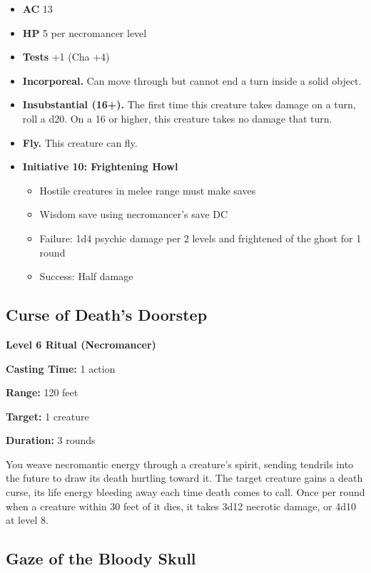 \documentclass[12pt,letterpaper,twocolumn,openany,nodeprecatedcode,bg=none]{dndbook}
\providecommand{\tightlist}{%
  \setlength{\itemsep}{0pt}\setlength{\parskip}{0pt}}
\begin{document}
\begin{itemize}
\tightlist
\item
  \textbf{AC} 13
\item
  \textbf{HP} 5 per necromancer level
\item
  \textbf{Tests} +1 (Cha +4)
\item
  \textbf{Incorporeal.} Can move through but cannot end a turn inside a
  solid object.
\item
  \textbf{Insubstantial (16+).} The first time this creature takes
  damage on a turn, roll a d20. On a 16 or higher, this creature takes
  no damage that turn.
\item
  \textbf{Fly.} This creature can fly.
\item
  \textbf{Initiative 10: Frightening Howl}

  \begin{itemize}
  \tightlist
  \item
    Hostile creatures in melee range must make saves
  \item
    Wisdom save using necromancer's save DC
  \item
    Failure: 1d4 psychic damage per 2 levels and frightened of the ghost
    for 1 round
  \item
    Success: Half damage
  \end{itemize}
\end{itemize}

\subsection{Curse of Death's Doorstep}\label{curse-of-deaths-doorstep}

\textbf{Level 6 Ritual (Necromancer)}

\textbf{Casting Time:} 1 action

\textbf{Range:} 120 feet

\textbf{Target:} 1 creature

\textbf{Duration:} 3 rounds

You weave necromantic energy through a creature's spirit, sending
tendrils into the future to draw its death hurtling toward it. The
target creature gains a death curse, its life energy bleeding away each
time death comes to call. Once per round when a creature within 30 feet
of it dies, it takes 3d12 necrotic damage, or 4d10 at level 8.

\subsection{Gaze of the Bloody Skull}\label{gaze-of-the-bloody-skull}
\end{document}

